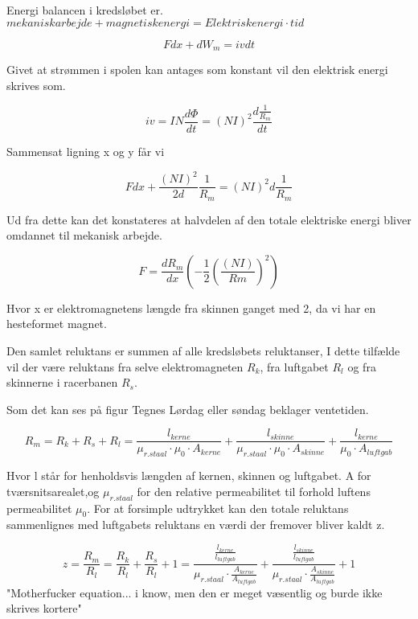 Energi balancen i kredsløbet er.
$mekanisk arbejde + magnetisk energi =Elektrisk energi \cdot tid$

\begin{equation}
F dx + dW_m = iv dt
\end{equation}

Givet at strømmen i spolen kan antages som konstant vil den elektrisk energi skrives som.

\begin{equation}
iv=IN \frac{d\Phi}{dt} =(NI)^2  \frac{d\frac{1}{R_m}}{dt}
\end{equation}


Sammensat ligning x og y får vi

\begin{equation}
F dx+\frac{(NI)^2}{2d} \frac{1}{R_m} =(NI)^2  d \frac{1}{R_m}
\end{equation}

Ud fra dette kan det konstateres at halvdelen af den totale elektriske energi bliver omdannet til mekanisk arbejde.

\begin{equation}
F = \frac{dR_m}{dx} (-\frac{1}{2} (\frac{(NI)}{Rm} )^2 )
\end{equation}

Hvor x er elektromagnetens længde fra skinnen ganget med 2, da vi har en hesteformet magnet.

Den samlet reluktans er summen af alle kredsløbets reluktanser, I dette tilfælde vil der være reluktans fra selve elektromagneten $R_k$, fra luftgabet $R_l$ og fra skinnerne i racerbanen $R_s$.

Som det kan ses på figur Tegnes Lørdag eller søndag beklager ventetiden.

\begin{equation}
R_m =R_k + R_s + R_l = \frac{l_{kerne}}{\mu_{r.staal} \cdot \mu_0 \cdot A_{kerne} } + \frac{l_{skinne}}{\mu_{r.staal} \cdot \mu_0 \cdot A_{skinne} }  + \frac{l_{kerne}}{\mu_0 \cdot A_{luftgab} }
\end{equation}

Hvor l står for henholdsvis længden af kernen, skinnen og luftgabet. A for tværsnitsarealet,og $ \mu_{r.staal} $ for den relative permeabilitet til forhold luftens permeabilitet $\mu_0$.  For at forsimple udtrykket kan den totale reluktans sammenlignes med luftgabets reluktans en værdi  der fremover bliver kaldt z.

\begin{equation}
z = \frac{R_m}{R_l} = \frac{R_k}{R_l} +\frac{R_s}{R_l} + 1 = \frac{
\frac{l_{kerne}}{l_{luftgab}} }
	{\mu_{r.staal} \cdot \frac{A_{kerne}}{A_{luftgab}} }
+
\frac{
	\frac{l_{skinne}}{l_{luftgab}} }
{\mu_{r.staal} \cdot \frac{A_{skinne}}{A_{luftgab}} }
+ 1
\end{equation}
"Motherfucker equation... i know, men den er meget væsentlig og burde ikke skrives kortere"

